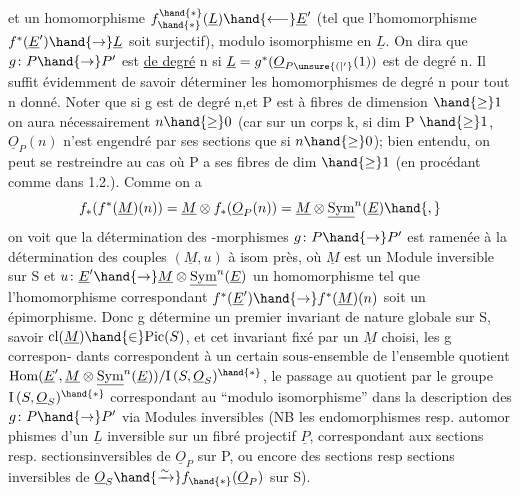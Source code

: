 
et  un homomorphisme  $f^{\hand{*}}_{\hand{*}}(\underline{L}) \hand{\longleftarrow} \underline{E}'$  (tel que l'homomorphisme 
$f^{*}(\underline{E}') \hand{\to} \underline{L}$  soit surjectif), modulo  isomorphisme en $\underline{L}$.  On dira que
$g\colon P \hand{\to} P'$  est \uline{de degré} n si $\underline{L} = g^{*}(\underline{O}_{P\unsure{(|'}}(1))$  est de degré n. Il suffit
évidemment de savoir déterminer les homomorphismes de degré n pour tout n
donné.  Noter que si g est de degré n,et P est à fibres de dimension $\hand{\geq} 1$ on aura nécessairement $n \hand{\geq} 0$
(car  sur un corps k,  si dim P $\hand{\geq} 1$, $\underline{O}_P(n)$ n'est engendré par ses
sections que si $n \hand{\geq} 0$); bien entendu, on peut  se restreindre au cas
où P a ses fibres de dim $\hand{\geq} 1$ (en procédant comme dans 1.2.).  Comme on a
\[ f_{*}(f^{*}(\underline{M})(n)) = \underline{M} \otimes f_{*}(\underline{O}_P(n)) = \underline{M} \otimes \underline{\mathrm{Sym}}^{n}(\underline{E}) \hand{,} \]
on voit que la détermination des -morphismes  $g\colon P \hand{\to} P'$  est ramenée
à la détermination des couples $(\underline{M},u)$ à isom près, où $\underline{M}$  est un Module
inversible sur S et  $u\colon \underline{E}' \hand{\to} \underline{M}\otimes\underline{\mathrm{Sym}}^{n}(\underline{E})$  un homomorphisme  tel que
l'homomorphisme correspondant  $f^{*}(\underline{E}') \hand{\to} f^{*}(\underline{M})(n)$  soit un épimorphisme.
Donc  g détermine un premier invariant de nature globale sur S, savoir
$\mathrm{cl}(\underline{M}) \hand{\in} \mathrm{Pic}(S)$, et cet invariant fixé par un $\underline{M}$ choisi,  les g correspon-%
dants correspondent à un certain sous-ensemble de l'ensemble quotient
$\mathrm{Hom}(\underline{E}',\underline{M}\otimes\underline{\mathrm{Sym}}^{n}(\underline{E}))/\mathrm{I}\,(S,\underline{O}_S)^{\hand{*}}$,  le passage au quotient par le groupe
$\mathrm{I}\,(S,\underline{O}_S)^{\hand{*}}$ correspondant  au  ``modulo isomorphisme'' dans la description
des $g\colon P \hand{\to} P'$ via Modules inversibles  (NB  les endomorphismes resp. automor
phismes d'un $\underline{L}$ inversible sur un fibré projectif $\underline{P}$, correspondant aux
sections resp. sections\hand{/}inversibles de $\underline{O}_P$ sur P,  ou encore des sections
resp sections inversibles de $\underline{O}_S \hand{\xrightarrow{\sim}} f_{\hand{*}}(\underline{O}_P)$ sur S).

